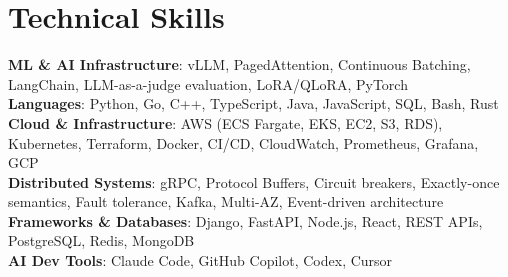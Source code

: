 \documentclass[letterpaper,11pt]{article}
\begin{document}
\section{Technical Skills}
\vspace{-7pt}
\begin{itemize}
[leftmargin=0.15in, label={}]\small{\item{
        \textbf{ML \& AI Infrastructure}{: vLLM, PagedAttention, Continuous Batching, LangChain, LLM-as-a-judge evaluation, LoRA/QLoRA, PyTorch} \\
        \textbf{Languages}{: Python, Go, C++, TypeScript, Java, JavaScript, SQL, Bash, Rust} \\
        \textbf{Cloud \& Infrastructure}{: AWS (ECS Fargate, EKS, EC2, S3, RDS), Kubernetes, Terraform, Docker, CI/CD, CloudWatch, Prometheus, Grafana, GCP} \\
        \textbf{Distributed Systems}{: gRPC, Protocol Buffers, Circuit breakers, Exactly-once semantics, Fault tolerance, Kafka, Multi-AZ, Event-driven architecture} \\
        \textbf{Frameworks \& Databases}{: Django, FastAPI, Node.js, React, REST APIs, PostgreSQL, Redis, MongoDB} \\
        \textbf{AI Dev Tools}{: Claude Code, GitHub Copilot, Codex, Cursor} \\
}}
\end{itemize}
\end{document}
